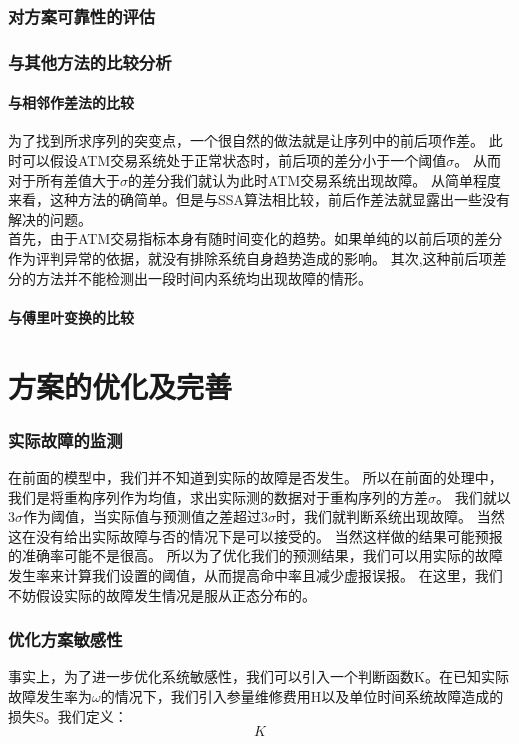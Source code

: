 \documentclass[a4paper]{article}
\begin{document}
\section{对方案可靠性的评估}
\section{与其他方法的比较分析}
\subsection{与相邻作差法的比较}
\indent 为了找到所求序列的突变点，一个很自然的做法就是让序列中的前后项作差。
此时可以假设ATM交易系统处于正常状态时，前后项的差分小于一个阈值$\sigma$。
从而对于所有差值大于$\sigma$的差分我们就认为此时ATM交易系统出现故障。
从简单程度来看，这种方法的确简单。但是与SSA算法相比较，前后作差法就显露出一些没有解决的问题。\\
\indent 首先，由于ATM交易指标本身有随时间变化的趋势。如果单纯的以前后项的差分作为评判异常的依据，就没有排除系统自身趋势造成的影响。
\indent 其次,这种前后项差分的方法并不能检测出一段时间内系统均出现故障的情形。
\subsection{与傅里叶变换的比较}

\part{方案的优化及完善}
\section{实际故障的监测}
\indent 在前面的模型中，我们并不知道到实际的故障是否发生。
所以在前面的处理中，我们是将重构序列作为均值，求出实际测的数据对于重构序列的方差$\sigma$。
我们就以$3\sigma$作为阈值，当实际值与预测值之差超过$3\sigma$时，我们就判断系统出现故障。
当然这在没有给出实际故障与否的情况下是可以接受的。
当然这样做的结果可能预报的准确率可能不是很高。
所以为了优化我们的预测结果，我们可以用实际的故障发生率来计算我们设置的阈值，从而提高命中率且减少虚报误报。
\indent 在这里，我们不妨假设实际的故障发生情况是服从正态分布的。\\
\indent 
\section{优化方案敏感性}
\indent 事实上，为了进一步优化系统敏感性，我们可以引入一个判断函数K。在已知实际故障发生率为$\omega$的情况下，我们引入参量维修费用H以及单位时间系统故障造成的损失S。我们定义：
\begin{equation}
K
\end{equation}
\end{document}
